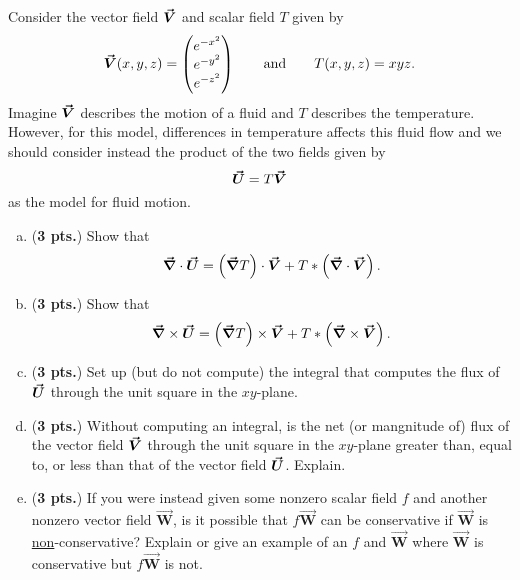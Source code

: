 \documentclass[12pt]{amsbook}
\newcommand{\vecfieldW}{\boldsymbol{\vec{W}}}
\begin{document}
\newpage
\begin{problem}
    Consider the vector field $\boldsymbol{\vec{V}}$ and scalar field $T$ given by
    \[
    \boldsymbol{\vec{V}}(x,y,z) = \begin{pmatrix} e^{-x^2} \\ e^{-y^2} \\ e^{-z^2} \end{pmatrix} \qquad \textrm{and} \qquad T(x,y,z) = xyz.
    \]
    Imagine $\boldsymbol{\vec{V}}$ describes the motion of a fluid and $T$ describes the temperature. However, for this model, differences in temperature affects this fluid flow and we should consider instead the product of the two fields given by
    \[
    \boldsymbol{\vec{U}} = T\boldsymbol{\vec{V}}
    \]
    as the model for fluid motion.
    \begin{enumerate}[(a)]
        \item (\textbf{3 pts.}) Show that
        \[
        \boldsymbol{\vec{\nabla}} \cdot \boldsymbol{\vec{U}} = \left(\boldsymbol{\vec{\nabla}} T\right) \cdot \boldsymbol{\vec{V}} + T* \left(\boldsymbol{\vec{\nabla}} \cdot \boldsymbol{\vec{V}}\right).
        \]
        \vspace*{.25cm}
        \item (\textbf{3 pts.}) Show that
        \[
        \boldsymbol{\vec{\nabla}} \times \boldsymbol{\vec{U}} = \left(\boldsymbol{\vec{\nabla}} T\right)\times \boldsymbol{\vec{V}} + T*\left(\boldsymbol{\vec{\nabla}} \times \boldsymbol{\vec{V}}\right).
        \]
                \vspace*{.25cm}

        \item (\textbf{3 pts.}) Set up (but do not compute) the integral that computes the flux of $\boldsymbol{\vec{U}}$ through the unit square in the $xy$-plane.
                \vspace*{.25cm}
        \item (\textbf{3 pts.}) Without computing an integral, is the net (or mangnitude of) flux of the vector field $\boldsymbol{\vec{V}}$ through the unit square in the $xy$-plane greater than, equal to, or less than that of the vector field $\boldsymbol{\vec{U}}$. Explain.
                \vspace*{.25cm}
                \item (\textbf{3 pts.}) If you were instead given some nonzero scalar field $f$ and another nonzero vector field $\vecfieldW$, is it possible that $f\vecfieldW$ can be conservative if $\vecfieldW$ is \underline{non}-conservative? Explain or give an example of an $f$ and $\vecfieldW$ where $\vecfieldW$ is conservative but $f\vecfieldW$ is not.
    \end{enumerate}
\end{problem}
\end{document}
